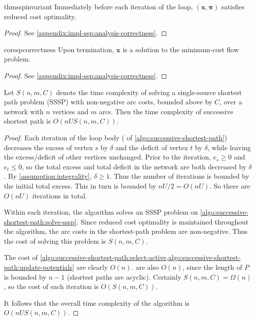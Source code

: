 \begin{restatable}{thm}{sspinvariant} \label{thm:ssp-invariant}
    Immediately before each iteration of the loop, $(\mathbf{x},\boldsymbol{\pi})$ satisfies reduced cost optimality.
\end{restatable}
\begin{proof}
See \cref{appendix:impl-ssp:analysis-correctness}.
\end{proof}
\begin{restatable}{cor}{sspcorrectness} \label{cor:ssp-correctness}
    Upon termination, $\mathbf{x}$ is a solution to the minimum-cost flow problem.
\end{restatable}
\begin{proof}
See \cref{appendix:impl-ssp:analysis-correctness}.
\end{proof}

\begin{thm} \label{thm:ssp-complexity}
Let $S(n,m,C)$ denote the time complexity of solving a single-source shortest path problem (SSSP) with non-negative arc costs, bounded above by $C$, over a network with $n$ vertices and $m$ arcs. Then the time complexity of successive shortest path is $O(nUS(n,m,C))$.
\end{thm}
\begin{proof}
Each iteration of the loop body ( of \cref{algo:successive-shortest-path}) decreases the excess of vertex $s$ by $\delta$ and the deficit of vertex $t$ by $\delta$, while leaving the excess/deficit of other vertices unchanged. Prior to the iteration, $e_s \geq 0$ and $e_t \leq 0$, so the total excess and total deficit in the network are both decreased by $\delta$. By \cref{assumption:integrality}, $\delta \geq 1$. Thus the number of iterations is bounded by the initial total excess. This in turn is bounded by $nU/2 = O(nU)$. So there are $O(nU)$ iterations in total.

Within each iteration, the algorithm solves an SSSP problem on \cref{algo:successive-shortest-path:solve-sssp}. Since reduced cost optimality is maintained throughout the algorithm, the arc costs in the shortest-path problem are non-negative\footnotemark. Thus the cost of solving this problem is $S(n,m,C)$.

The cost of \cref{algo:successive-shortest-path:select-active,algo:successive-shortest-path:update-potentials} are clearly $O(n)$.  are also $O(n)$, since the length of $P$ is bounded by $n-1$ (shortest paths are acyclic). Certainly $S(n,m,C) = \Omega(n)$, so the cost of each iteration is $O(S(n,m,C))$.

It follows that the overall time complexity of the algorithm is $O(nUS(n,m,C))$.
\end{proof}

